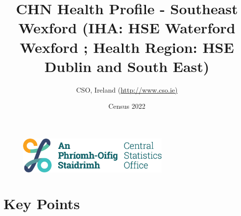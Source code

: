\documentclass{article}
\title{CHN Health Profile - Southeast Wexford (IHA: HSE Waterford Wexford ;  Health Region: HSE Dublin and South East) }
\date{Census 2022}
\author{CSO, Ireland  (\url{http://www.cso.ie)}}
\begin{document}


\begin{figure}
	\centering
\includegraphics[width =75mm]{../figures/CSO_Logo.png}
\end{figure}

				 
		   
						  
														  
																																													
												 
			 
\maketitle
					
													   
				 
						 
																																																																											   
				 
				  
  \pagebreak
    	    \tableofcontents

\pagebreak


\section{Key Points}
\end{document}
